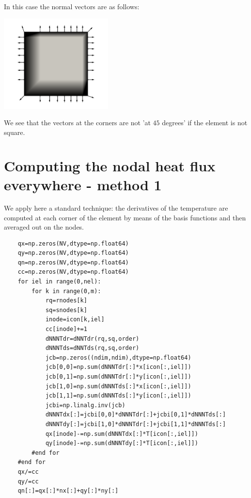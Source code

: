 In this case the normal vectors are as follows:
\begin{center}
\includegraphics[width=5.7cm]{python_codes/fieldstone_173/results/normals}
\end{center}
We see that the vectors at the corners are not 'at $45$ degrees' if the element is not square.


\section*{Computing the nodal heat flux everywhere - method 1}

We apply here a standard technique: the derivatives of the temperature 
are computed at each corner of the element by means of the basis functions
and then averaged out on the nodes.

\begin{lstlisting}
    qx=np.zeros(NV,dtype=np.float64) 
    qy=np.zeros(NV,dtype=np.float64) 
    qn=np.zeros(NV,dtype=np.float64) 
    cc=np.zeros(NV,dtype=np.float64) 
    for iel in range(0,nel):
        for k in range(0,m):
            rq=rnodes[k]
            sq=snodes[k]
            inode=icon[k,iel]
            cc[inode]+=1
            dNNNTdr=dNNTdr(rq,sq,order)
            dNNNTds=dNNTds(rq,sq,order)
            jcb=np.zeros((ndim,ndim),dtype=np.float64)
            jcb[0,0]=np.sum(dNNNTdr[:]*x[icon[:,iel]])
            jcb[0,1]=np.sum(dNNNTdr[:]*y[icon[:,iel]])
            jcb[1,0]=np.sum(dNNNTds[:]*x[icon[:,iel]])
            jcb[1,1]=np.sum(dNNNTds[:]*y[icon[:,iel]])
            jcbi=np.linalg.inv(jcb)
            dNNNTdx[:]=jcbi[0,0]*dNNNTdr[:]+jcbi[0,1]*dNNNTds[:]
            dNNNTdy[:]=jcbi[1,0]*dNNNTdr[:]+jcbi[1,1]*dNNNTds[:]
            qx[inode]-=np.sum(dNNNTdx[:]*T[icon[:,iel]])
            qy[inode]-=np.sum(dNNNTdy[:]*T[icon[:,iel]])
        #end for
    #end for
    qx/=cc
    qy/=cc
    qn[:]=qx[:]*nx[:]+qy[:]*ny[:]
\end{lstlisting}

